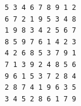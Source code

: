 \begin{Verbatim}[fontsize=\small, frame=single]
5 3 4 6 7 8 9 1 2
6 7 2 1 9 5 3 4 8
1 9 8 3 4 2 5 6 7
8 5 9 7 6 1 4 2 3
4 2 6 8 5 3 7 9 1
7 1 3 9 2 4 8 5 6
9 6 1 5 3 7 2 8 4
2 8 7 4 1 9 6 3 5
3 4 5 2 8 6 1 7 9
\end{Verbatim}
